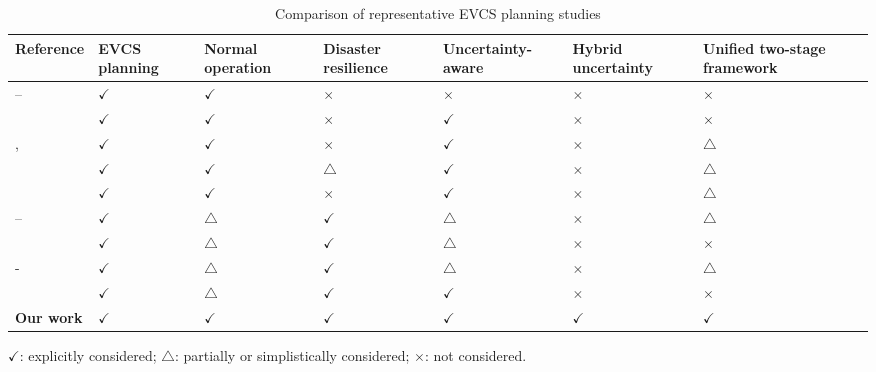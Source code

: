 \documentclass[journal]{IEEEtran}
\providecommand{\1}{\mathbf{1}}
\begin{document}
\begin{table}[t]
\centering
\captionsetup{font=footnotesize}
\caption{Comparison of representative EVCS planning studies}
\label{tab:lit_compare}
\renewcommand{\arraystretch}{1.15}
\setlength{\tabcolsep}{1pt}
\begin{tabular}{M{1.4cm}|M{2.1cm}|M{2.3cm}|M{2.4cm}|M{2.5cm}|M{2.5cm}|M{3.9cm}}
\hline
\textbf{Reference} & \textbf{EVCS planning} & \textbf{Normal operation } & \textbf{Disaster resilience} & \textbf{Uncertainty-aware} & \textbf{Hybrid uncertainty} & \textbf{Unified two-stage framework} \\
\hline
{\cite{zeng2020bilevel}--\cite{ferro2022coupledEVCS}}  & $\checkmark$ & $\checkmark$ & $\times$ & $\times$ & $\times$ & $\times$ \\
{\cite{kapoor2024fastEVCS}}  & $\checkmark$ & $\checkmark$ & $\times$ & $\checkmark$ & $\times$ & $\times$ \\
{\cite{ferraz2025pricingEVCS},\cite{Yao2025PVGridEV}}  & $\checkmark$ & $\checkmark$ & $\times$ & $\checkmark$ & $\times$ & $\triangle$ \\
{\cite{dong2025stochasticEVCS}}  & $\checkmark$ & $\checkmark$ & $\triangle$ & $\checkmark$ & $\times$ & $\triangle$ \\
{\cite{alharbi2025jointEVCS}}  & $\checkmark$ & $\checkmark$ & $\times$ & $\checkmark$ & $\times$ & $\triangle$ \\
{\cite{yu2025mallEVCS}--\cite{cui2025adaptiveEVCS}} & $\checkmark$ & $\triangle$ & $\checkmark$ & $\triangle$ & $\times$ & $\triangle$ \\
{\cite{li2025msdroHCS}} & $\checkmark$ & $\triangle$ & $\checkmark$ & $\triangle$ & $\times$ & $\times$ \\
{\cite{Mei2025EVCSResilience}-\cite{Wen2025RobustEVCS}} & $\checkmark$ & $\triangle$ & $\checkmark$ & $\triangle$ & $\times$ & $\triangle$ \\
{\cite{Akhgarzarandy2021EVCSResilience} } & $\checkmark$ & $\triangle$ & $\checkmark$ & $\checkmark$ & $\times$ & $\times$ \\
\textbf{Our work} & \textbf{$\checkmark$} & \textbf{$\checkmark$} & \textbf{$\checkmark$} & \textbf{$\checkmark$} & \textbf{$\checkmark$} & \textbf{$\checkmark$} \\
\hline
\end{tabular}
\vspace{2pt}
\begin{minipage}{0.95\textwidth}
\footnotesize
\centering
$\checkmark$: explicitly considered; $\triangle$: partially or simplistically considered; $\times$: not considered.
\end{minipage}
\end{table}
\end{document}
